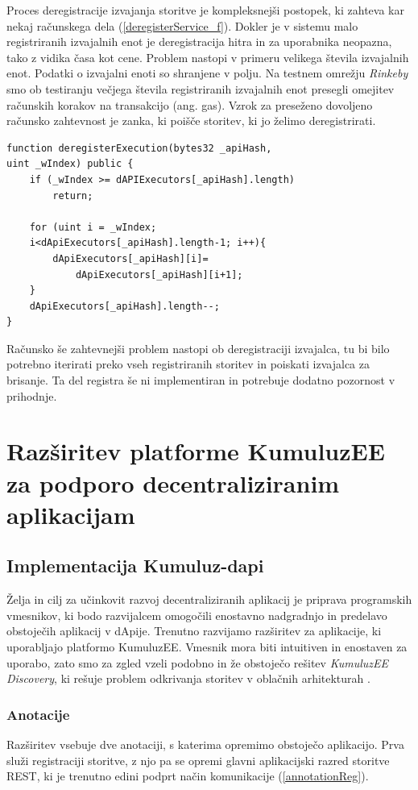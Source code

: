 \documentclass[a4paper, 12pt]{book}
\begin{document}
Proces deregistracije izvajanja storitve je kompleksnejši postopek, ki zahteva kar nekaj računskega dela (\ref{deregisterService_f}).
Dokler je v sistemu malo registriranih izvajalnih enot je deregistracija hitra in za uporabnika neopazna, tako z vidika časa kot cene.
Problem nastopi v primeru velikega števila izvajalnih enot.
Podatki o izvajalni enoti so shranjene v polju.
Na testnem omrežju \textit{Rinkeby} smo ob testiranju večjega števila registriranih izvajalnih enot presegli omejitev računskih korakov na transakcijo (ang. gas).
Vzrok za preseženo dovoljeno računsko zahtevnost je zanka, ki poišče storitev, ki jo želimo deregistrirati.

\begin{lstlisting}[caption={Deregistracija izvajanja},captionpos=b,label={deregisterService_f}]
function deregisterExecution(bytes32 _apiHash, 
uint _wIndex) public {
	if (_wIndex >= dAPIExecutors[_apiHash].length)
		return;
	
	for (uint i = _wIndex;
	i<dApiExecutors[_apiHash].length-1; i++){
		dApiExecutors[_apiHash][i]=
			dApiExecutors[_apiHash][i+1];
	}
	dApiExecutors[_apiHash].length--;
}
\end{lstlisting}

Računsko še zahtevnejši problem nastopi ob deregistraciji izvajalca, tu bi bilo potrebno iterirati preko vseh registriranih storitev in poiskati izvajalca za brisanje.
Ta del registra še ni implementiran in potrebuje dodatno pozornost v prihodnje.


\section{Razširitev platforme KumuluzEE za podporo decentraliziranim aplikacijam}

\subsection{Implementacija Kumuluz-dapi}
Želja in cilj za učinkovit razvoj decentraliziranih aplikacij je priprava programskih vmesnikov, ki bodo razvijalcem omogočili enostavno nadgradnjo in predelavo obstoječih aplikacij v dApije.
Trenutno razvijamo razširitev za aplikacije, ki uporabljajo platformo KumuluzEE.
Vmesnik mora biti intuitiven in enostaven za uporabo, zato smo za zgled vzeli podobno in že obstoječo rešitev \textit{KumuluzEE Discovery}, ki rešuje problem odkrivanja storitev v oblačnih arhitekturah \cite{maldip}.

\subsubsection{Anotacije}
Razširitev vsebuje dve anotaciji, s katerima opremimo obstoječo aplikacijo.
Prva služi registraciji storitve, z njo pa se opremi glavni aplikacijski razred storitve REST, ki je trenutno edini podprt način komunikacije (\ref{annotationReg}).
\end{document}
